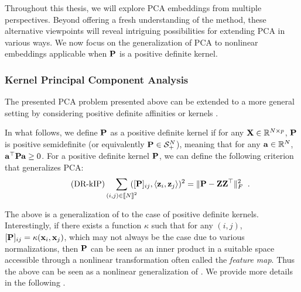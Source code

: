 Throughout this thesis, we will explore PCA embeddings from multiple perspectives. Beyond offering a fresh understanding of the method, these alternative viewpoints will reveal intriguing possibilities for extending PCA in various ways. We now focus on the generalization of PCA to nonlinear embeddings applicable when ${\mathbf{P}}$ is a positive definite kernel.

\subsubsection{Kernel Principal Component Analysis}

The presented PCA problem presented above can be extended to a more general setting by considering positive definite affinities or kernels \citep{scholkopf1998nonlinear}. 

In what follows, we define ${\mathbf{P}}$ as a positive definite kernel if for any ${\mathbf{X}} \in \mathbb{R}^{N \times p}$, ${\mathbf{P}}$ is positive semidefinite (or equivalently ${\mathbf{P}} \in \mathcal{S}^N_{+}$), meaning that for any ${\mathbf{a}} \in \mathbb{R}^N$, ${\mathbf{a}}^\top {\mathbf{P}} {\mathbf{a}} \geq 0$. For a positive definite kernel ${\mathbf{P}}$, we can define the following criterion that generalizes PCA:
\begin{align}\label{eq:DR_kIP}\tag{DR-kIP}
	\sum_{(i,j) \in {[\![N]\!]}^2} \!\!\!\!\! ([{\mathbf{P}}]_{ij}, \langle {\mathbf{z}}_i, {\mathbf{z}}_j \rangle)^2 = \| {\mathbf{P}} - {\mathbf{Z}}{\mathbf{Z}}^\top \|^2_F\ \:.
\end{align}

The above is a generalization of  to the case of positive definite kernels.
Interestingly, if there exists a function $\kappa$ such that for any $(i,j)$, $[{\mathbf{P}}]_{ij} = \kappa({\mathbf{x}}_i, {\mathbf{x}}_j)$, which may not always be the case due to various normalizations, then ${\mathbf{P}}$ can be seen as an inner product in a suitable space accessible through a nonlinear transformation often called the \emph{feature map}. Thus the above  can be seen as a nonlinear generalization of . We provide more details in the following .

